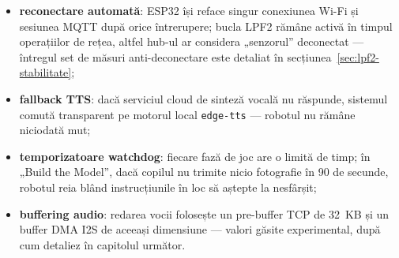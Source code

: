 \begin{itemize}
    \item \textbf{reconectare automată}: ESP32 își reface singur conexiunea Wi-Fi și sesiunea MQTT după orice întrerupere; bucla LPF2 rămâne activă în timpul operațiilor de rețea, altfel hub-ul ar considera „senzorul” deconectat — întregul set de măsuri anti-deconectare este detaliat în secțiunea~\ref{sec:lpf2-stabilitate};
    \item \textbf{fallback TTS}: dacă serviciul cloud de sinteză vocală nu răspunde, sistemul comută transparent pe motorul local \texttt{edge-tts} — robotul nu rămâne niciodată mut;
    \item \textbf{temporizatoare watchdog}: fiecare fază de joc are o limită de timp; în „Build the Model”, dacă copilul nu trimite nicio fotografie în 90 de secunde, robotul reia blând instrucțiunile în loc să aștepte la nesfârșit;
    \item \textbf{buffering audio}: redarea vocii folosește un pre-buffer TCP de 32~KB și un buffer DMA I2S de aceeași dimensiune — valori găsite experimental, după cum detaliez în capitolul următor.
\end{itemize}
